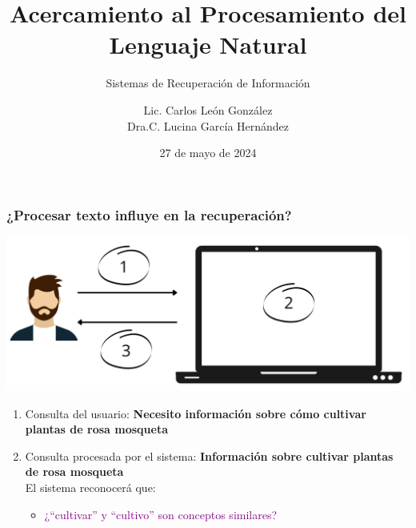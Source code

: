 \documentclass[
10pt, %
aspectratio=169, %
]{beamer}
\title[Short Title]{Acercamiento al Procesamiento del Lenguaje Natural}
\subtitle{Sistemas de Recuperación de Información}
\author{Lic. Carlos León González \\ Dra.C. Lucina García Hernández}
\institute[UC]{Facultad de Matem\'atica y Computaci\'on \\ Universidad de La Habana \\ \smallskip }
\date{27 de mayo de  2024}
\begin{document}
	
	
	
	\begin{frame}
		\titlepage
	\end{frame}
	
	
	\begin{frame}
		
		\frametitle{¿Procesar texto influye en la recuperación?}
		
		\centering
		\includegraphics[scale=0.3]{motivacion.png} 
		
		
		\begin{enumerate}
			
			\pause
			\item Consulta del usuario: \textbf{Necesito información sobre cómo cultivar plantas de rosa mosqueta}
			
			\vspace{1\baselineskip}
			\pause 
			\item Consulta procesada por el sistema: \textbf{Información sobre cultivar plantas de rosa mosqueta} \\ 
			
			\pause
			\vspace{1\baselineskip}
			El sistema reconocerá que:
			
			\begin{itemize}
				\item \textcolor{purple}{¿``cultivar'' y ``cultivo'' son conceptos similares?}
				

\end{itemize}
\end{enumerate}
\end{frame}
\end{document}

